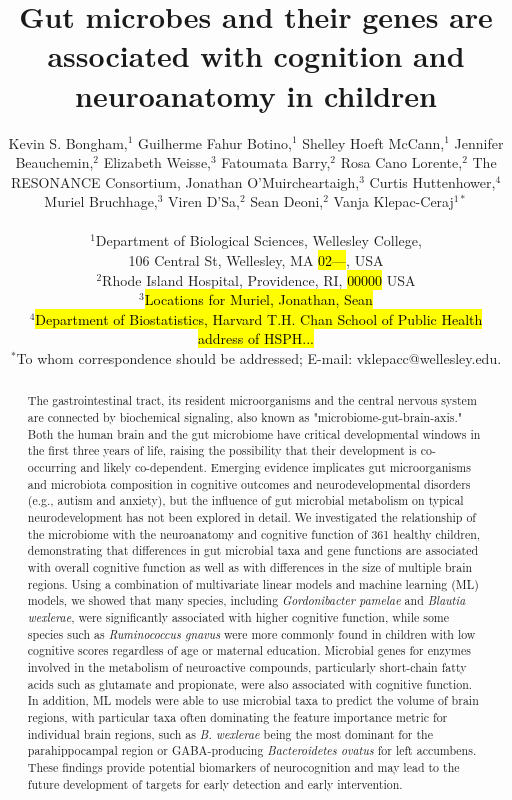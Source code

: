 \documentclass{article}
\title{Gut microbes and their genes are associated with cognition and neuroanatomy in children}
\author{%
    \parbox{\linewidth}{\centering
        Kevin S. Bongham,$^{1}$
        Guilherme Fahur Botino,$^{1}$
        Shelley Hoeft McCann,$^{1}$
        Jennifer Beauchemin,$^{2}$
        Elizabeth Weisse,$^{3}$
        Fatoumata Barry,$^{2}$
        Rosa Cano Lorente,$^{2}$
        The RESONANCE Consortium,
        Jonathan O'Muircheartaigh,$^{3}$
        Curtis Huttenhower,$^{4}$
        Muriel Bruchhage,$^{3}$
        Viren D’Sa,$^{2}$
        Sean Deoni,$^{2}$
        Vanja Klepac-Ceraj$^{1\ast}$
    }
\\
\normalsize{$^{1}$Department of Biological Sciences, Wellesley College,}\\
\normalsize{106 Central St, Wellesley, MA \hl{02---}, USA}\\
\normalsize{$^{2}$Rhode Island Hospital, Providence, RI, \hl{00000} USA}\\
\normalsize{$^{3}$\hl{Locations for Muriel, Jonathan, Sean}}\\
\normalsize{$^{4}$\hl{Department of Biostatistics, Harvard T.H. Chan School of Public Health}}\\
\normalsize{\hl{address of HSPH...}}
\\
\normalsize{$^\ast$To whom correspondence should be addressed; E-mail:  vklepacc@wellesley.edu.}
}
\date{}
\begin{document}
\baselineskip24pt


\maketitle 

\begin{abstract}
The gastrointestinal tract, its resident microorganisms and the central
nervous system are connected by biochemical signaling, also known as
"microbiome-gut-brain-axis." Both the human brain and the gut microbiome
have critical developmental windows in the first three years of life,
raising the possibility that their development is co-occurring and
likely co-dependent. Emerging evidence implicates gut microorganisms and
microbiota composition in cognitive outcomes and neurodevelopmental
disorders (e.g., autism and anxiety), but the influence of gut microbial
metabolism on typical neurodevelopment has not been explored in detail.
We investigated the relationship of the microbiome with the neuroanatomy
and cognitive function of 361 healthy children, demonstrating that
differences in gut microbial taxa and gene functions are associated with
overall cognitive function as well as with differences in the size of
multiple brain regions. Using a combination of multivariate linear
models and machine learning (ML) models, we showed that many species,
including \emph{Gordonibacter pamelae} and \emph{Blautia wexlerae}, were
significantly associated with higher cognitive function, while some
species such as \emph{Ruminococcus gnavus} were more commonly found in
children with low cognitive scores regardless of age or maternal
education. Microbial genes for enzymes involved in the metabolism of
neuroactive compounds, particularly short-chain fatty acids such as
glutamate and propionate, were also associated with cognitive function.
In addition, ML models were able to use microbial taxa to predict the
volume of brain regions, with particular taxa often dominating the
feature importance metric for individual brain regions, such as \emph{B.
wexlerae} being the most dominant for the parahippocampal region or
GABA-producing \emph{Bacteroidetes ovatus} for left accumbens. These
findings provide potential biomarkers of neurocognition and may lead to
the future development of targets for early detection and early
intervention.
\end{abstract}

\end{document}
